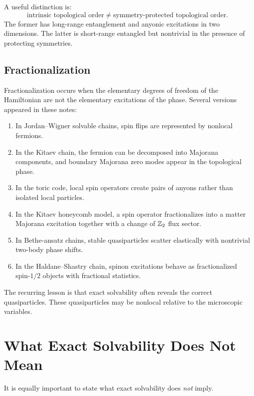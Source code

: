 A useful distinction is:
\begin{equation}
\label{eq:conclusion-topology-distinction}
    \text{intrinsic topological order}
    \neq
    \text{symmetry-protected topological order}.
\end{equation}
The former has long-range entanglement and anyonic excitations in two dimensions.  The latter is short-range entangled but nontrivial in the presence of protecting symmetries.

\subsection{Fractionalization}

Fractionalization occurs when the elementary degrees of freedom of the Hamiltonian are not the elementary excitations of the phase.  Several versions appeared in these notes:
\begin{enumerate}[label=(\roman*)]
    \item In Jordan--Wigner solvable chains, spin flips are represented by nonlocal fermions.
    \item In the Kitaev chain, the fermion can be decomposed into Majorana components, and boundary Majorana zero modes appear in the topological phase.
    \item In the toric code, local spin operators create pairs of anyons rather than isolated local particles.
    \item In the Kitaev honeycomb model, a spin operator fractionalizes into a matter Majorana excitation together with a change of \(\mathbb{Z}_2\) flux sector.
    \item In Bethe-ansatz chains, stable quasiparticles scatter elastically with nontrivial two-body phase shifts.
    \item In the Haldane--Shastry chain, spinon excitations behave as fractionalized spin-\(1/2\) objects with fractional statistics.
\end{enumerate}

The recurring lesson is that exact solvability often reveals the correct quasiparticles.  These quasiparticles may be nonlocal relative to the microscopic variables.

\section{What Exact Solvability Does Not Mean}
\label{sec:what-solvability-does-not-mean}

It is equally important to state what exact solvability does \emph{not} imply.

